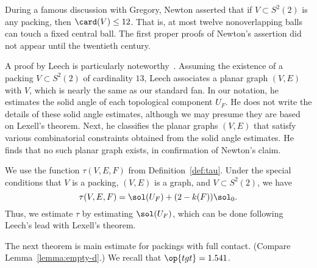 \begin{remark}
During a famous discussion with Gregory, Newton asserted that 
if $V\subset S^2(2)$ is any packing, then $\card(V)\le 12$. That is, at most
twelve nonoverlapping balls can touch a fixed central ball.  The first proper
proofs of Newton's assertion did not appear until the twentieth century.
%
%
%
%
%
  
A proof by Leech is particularly
noteworthy~\cite{Leech:1956:MG}.  Assuming the existence of a packing
$V\subset S^2(2)$ of cardinality $13$, Leech associates a planar graph
$(V,E)$ with $V$, which is nearly the same as our standard fan.  In
our notation, he estimates the solid angle of each topological
component $U_F$.  He does not write the details of these solid angle
estimates, although we may presume they are based on Lexell's theorem.
Next, he classifies the planar graphs $(V,E)$ that satisfy various
combinatorial constraints obtained from the solid angle estimates. He
finds that no such planar graph exists, in confirmation of Newton's
claim.
\end{remark}

We use the function $\tau(V,E,F)$ from Definition~\ref{def:tau}.  Under the 
special conditions that 
$V$ is a packing, $(V,E)$ is a  graph, and
$V\subset S^2(2)$, we have 
\[
\tau(V,E,F) = \sol(U_F) + (2-k(F)) \sol_0.
\]
Thus, we estimate $\tau$ by estimating $\sol(U_F)$, which can be done
following Leech's lead with Lexell's theorem.


The next theorem is main estimate for packings with full contact.
(Compare  Lemma~\ref{lemma:empty-d}.)  
We recall that $\op{tgt}=1.541$.
%
%


